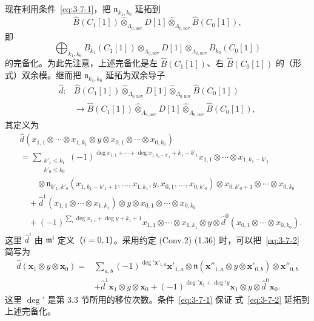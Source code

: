 现在利用条件~\eqref{eq:3-7-1}，把 $\mathfrak n_{k_1,k_0}$ 延拓到
\[
  \widehat B(C_1[1])\widehat\otimes_{\Lambda_{0,\mathrm{nov}}}D[1]
  \widehat\otimes_{\Lambda_{0,\mathrm{nov}}}\widehat B(C_0[1]),
\]
即
\[
  \bigoplus_{k_1,k_0}B_{k_1}(C_1[1])
  \otimes_{\Lambda_{0,\mathrm{nov}}}D[1]
  \otimes_{\Lambda_{0,\mathrm{nov}}}B_{k_0}(C_0[1])
\]
的完备化。为此先注意，上述完备化是左
$\widehat B(C_1[1])$、右 $\widehat B(C_0[1])$ 的（形式）双余模。继而把
$\mathfrak n_{k_1,k_0}$ 延拓为双余导子
\[
\begin{aligned}
  \widehat d\colon{}&
  \widehat B(C_1[1])\widehat\otimes_{\Lambda_{0,\mathrm{nov}}}D[1]
  \widehat\otimes_{\Lambda_{0,\mathrm{nov}}}\widehat B(C_0[1])\\
  &\longrightarrow
  \widehat B(C_1[1])\widehat\otimes_{\Lambda_{0,\mathrm{nov}}}D[1]
  \widehat\otimes_{\Lambda_{0,\mathrm{nov}}}\widehat B(C_0[1]),
\end{aligned}
\]
其定义为
\begin{equation}
\begin{aligned}
&\widehat d(x_{1,1}\otimes\cdots\otimes x_{1,k_1}
  \otimes y\otimes x_{0,1}\otimes\cdots\otimes x_{0,k_0})\\
&={}
\sum_{\substack{k'_1\leq k_1\\k'_0\leq k_0}}
(-1)^{\deg x_{1,1}+\cdots+\deg x_{1,k_1-k'_1}+k_1-k'_1}
  x_{1,1}\otimes\cdots\otimes x_{1,k_1-k'_1}\\
&\qquad\otimes
  \mathfrak n_{k'_1,k'_0}
  (x_{1,k_1-k'_1+1},\ldots,x_{1,k_1},y,
   x_{0,1},\ldots,x_{0,k'_0})
  \otimes x_{0,k'_0+1}\otimes\cdots\otimes x_{0,k_0}\\
&\quad+
  \widehat d^{1}(x_{1,1}\otimes\cdots\otimes x_{1,k_1})
  \otimes y\otimes x_{0,1}\otimes\cdots\otimes x_{0,k_0}\\
&\quad+
  (-1)^{\sum_i\deg x_{1,i}+\deg y+k_1+1}
  x_{1,1}\otimes\cdots\otimes x_{1,k_1}\otimes y
  \otimes\widehat d^{0}(x_{0,1}\otimes\cdots\otimes x_{0,k_0}).
\end{aligned}
\tag{3.7.2}\label{eq:3-7-2}
\end{equation}
这里 $\widehat d^{i}$ 由 $\mathfrak m^i$ 定义（$i=0,1$）。采用约定
(Conv.2) (1.36) 时，可以把~\eqref{eq:3-7-2} 简写为
\begin{equation}
\begin{aligned}
\widehat d(\mathbf x_1\otimes y\otimes\mathbf x_0)
={}&\sum_{a,b}(-1)^{\deg'\mathbf x'_{1,a}}
  \mathbf x'_{1,a}\otimes
  \mathfrak n(\mathbf x''_{1,a}\otimes y\otimes\mathbf x'_{0,b})
  \otimes\mathbf x''_{0,b}\\
&+\widehat d^{1}\mathbf x_1\otimes y\otimes\mathbf x_0
 +(-1)^{\deg'\mathbf x_1+\deg' y}
  \mathbf x_1\otimes y\otimes\widehat d^{0}\mathbf x_0.
\end{aligned}
\tag{3.7.3}\label{eq:3-7-3}
\end{equation}
这里 $\deg'$ 是第 3.3 节所用的移位次数。条件~\eqref{eq:3-7-1} 保证
式~\eqref{eq:3-7-2} 延拓到上述完备化。

